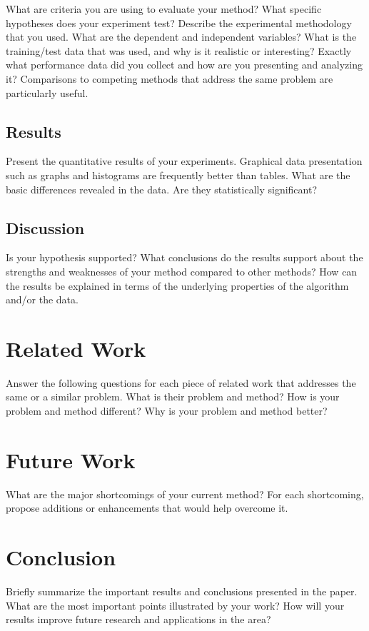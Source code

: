 \documentclass[11pt]{article}
\begin{document}
What are criteria you are using to evaluate your method? What specific hypotheses does your experiment test? Describe the experimental methodology that you used. What are the dependent and independent variables? What is the training/test data that was used, and why is it realistic or interesting? Exactly what performance data did you collect and how are you presenting and analyzing it? Comparisons to competing methods that address the same problem are particularly useful. 

\subsection{Results}

Present the quantitative results of your experiments. Graphical data presentation such as graphs and histograms are frequently better than tables. What are the basic differences revealed in the data. Are they statistically significant? 

\subsection{Discussion}

Is your hypothesis supported? What conclusions do the results support about the strengths and weaknesses of your method compared to other methods? How can the results be explained in terms of the underlying properties of the algorithm and/or the data. 

\section{Related Work}

Answer the following questions for each piece of related work that addresses the same or a similar problem. What is their problem and method? How is your problem and method different? Why is your problem and method better? 

\section{Future Work}

What are the major shortcomings of your current method? For each shortcoming, propose additions or enhancements that would help overcome it. 

\section{Conclusion}
Briefly summarize the important results and conclusions presented in the paper. What are the most important points illustrated by your work? How will your results improve future research and applications in the area? 
\end{document}
